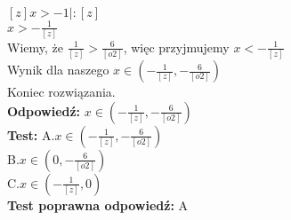 \documentclass[12pt, a4paper]{article}
\theoremstyle{definition} %
\newcommand{\rozwStop}{\newline}                                            %
\newcommand{\odpStart}{\noindent \textbf{Odpowiedź:}\newline}    %
\newcommand{\odpStop}{\newline}                                             %
\newcommand{\testStart}{\noindent \textbf{Test:}\newline} %
\newcommand{\testStop}{\newline} %
\newcommand{\kluczStart}{\noindent \textbf{Test poprawna odpowiedź:}\newline} %
\newcommand{\kluczStop}{\newline} %
\begin{document}
$ [z]x > -1 |:[z]$\\
$ x > -\frac{1}{[z]} $\\
\newline
Wiemy, że $ \frac{1}{[z]} > \frac{6}{[o2]} $, więc przyjmujemy $ x < -\frac{1}{[z]} $\\
Wynik dla naszego $ x \in (-\frac{1}{[z]},-\frac{6}{[o2]}) $\\
Koniec rozwiązania.\\
\rozwStop
\odpStart
$ x \in (-\frac{1}{[z]},-\frac{6}{[o2]}) $\\
\odpStop
\testStart
A.$ x \in (-\frac{1}{[z]},-\frac{6}{[o2]}) $\\
B.$ x \in (0,-\frac{6}{[o2]}) $\\
C.$ x \in (-\frac{1}{[z]},0) $\\
\testStop
\kluczStart
A
\kluczStop
\end{document}
